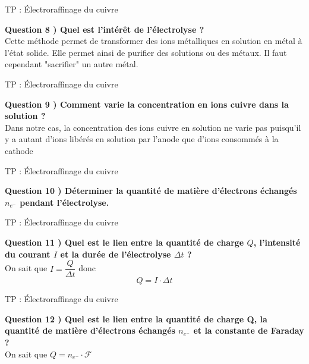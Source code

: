 \documentclass{beamer}
\begin{document}
\begin{frame}{TP : Électroraffinage du cuivre}
\begin{minipage}{\linewidth}
\textbf{Question 8 ) Quel est l'intérêt de l'électrolyse ?}\\
Cette méthode permet de transformer des ions métalliques en solution en métal à l'état solide. Elle permet ainsi de purifier des solutions ou des métaux. Il faut cependant "sacrifier" un autre métal.
\end{minipage}
\end{frame}

\begin{frame}{TP : Électroraffinage du cuivre}
\begin{minipage}{\linewidth}
\textbf{Question 9 ) Comment varie la concentration en ions cuivre dans la solution ?}\\
Dans notre cas, la concentration des ions cuivre en solution ne varie pas puisqu'il y a autant d'ions libérés en solution par l'anode que d'ions consommés à la cathode
\end{minipage}
\end{frame}

\begin{frame}{TP : Électroraffinage du cuivre}
\begin{minipage}{\linewidth}
\textbf{Question 10 ) Déterminer la quantité de matière d’électrons échangés $n_{e^-}$ pendant l’électrolyse.}\\
\vspace{5cm}
\end{minipage}
\end{frame}

\begin{frame}{TP : Électroraffinage du cuivre}
\begin{minipage}{\linewidth}
\textbf{Question 11 ) Quel est le lien entre la quantité de charge $Q$, l’intensité du courant $I$ et la durée de l’électrolyse $\Delta t$ ?}\\
On sait que $I=\dfrac{Q}{\Delta t}$ donc $$ Q = I \cdot \Delta t$$
\end{minipage}
\end{frame}

\begin{frame}{TP : Électroraffinage du cuivre}
\begin{minipage}{\linewidth}
\textbf{Question 12 ) Quel est le lien entre la quantité de charge Q, la quantité de matière d’électrons échangés $n_{e^-}$ et la constante de Faraday ?}\\
On sait que $Q = n_{e^-} \cdot \mathcal{F}$
\end{minipage}
\end{frame}
\end{document}

